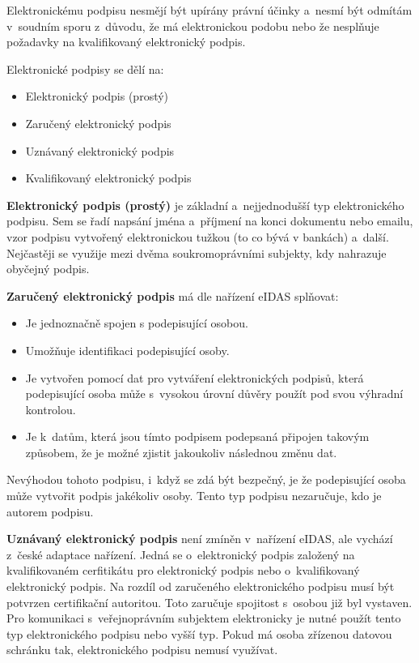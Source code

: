 Elektronickému podpisu nesmějí být upírány právní účinky a~nesmí být odmítám v~soudním sporu z~důvodu, že má elektronickou podobu nebo že nesplňuje požadavky na kvalifikovaný elektronický podpis.

Elektronické podpisy se dělí na:
\begin{itemize}[noitemsep]
    \item Elektronický podpis (prostý)
    \item Zaručený elektronický podpis
    \item Uznávaný elektronický podpis
    \item Kvalifikovaný elektronický podpis
\end{itemize}

\textbf{Elektronický podpis (prostý)} je základní a~nejjednodušší typ elektronického podpisu. Sem se řadí napsání jména a~příjmení na konci dokumentu nebo emailu, vzor podpisu vytvořený elektronickou tužkou (to co bývá v bankách) a~další. Nejčastěji se využije mezi dvěma soukromoprávními subjekty, kdy nahrazuje obyčejný podpis.

\textbf{Zaručený elektronický podpis} má dle nařízení eIDAS splňovat:
\begin{itemize}[noitemsep]
    \item Je jednoznačně spojen s podepisující osobou.
    \item Umožňuje identifikaci podepisující osoby.
    \item Je vytvořen pomocí dat pro vytváření elektronických podpisů, která podepisující osoba může s~vysokou úrovní důvěry použít pod svou výhradní kontrolou.
    \item Je k~datům, která jsou tímto podpisem podepsaná připojen takovým způsobem, že je možné zjistit jakoukoliv následnou změnu dat.
\end{itemize}

Nevýhodou tohoto podpisu, i~když se zdá být bezpečný, je že podepisující osoba může vytvořit podpis jakékoliv osoby. Tento typ podpisu nezaručuje, kdo je autorem podpisu. 

\textbf{Uznávaný elektronický podpis} není zmíněn v~nařízení eIDAS, ale vychází z~české adaptace nařízení. Jedná se o~elektronický podpis založený na kvalifikovaném cerfitikátu pro elektronický podpis nebo o~kvalifikovaný elektronický podpis. Na rozdíl od zaručeného elektronického podpisu musí být potvrzen certifikační autoritou. Toto zaručuje spojitost s~osobou již byl vystaven. Pro komunikaci s~veřejnoprávním subjektem elektronicky je nutné použít tento typ elektronického podpisu nebo vyšší typ. Pokud má osoba zřízenou datovou schránku tak, elektronického podpisu nemusí využívat.

